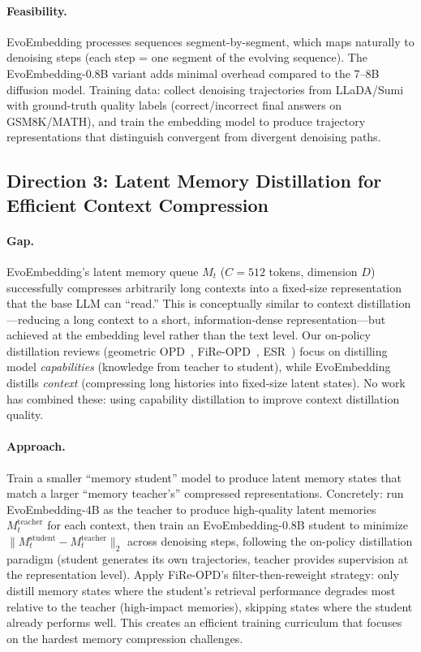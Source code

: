 \documentclass[11pt,a4paper]{article}
\begin{document}
\paragraph{Feasibility.} EvoEmbedding processes sequences segment-by-segment, which maps naturally to denoising steps (each step = one segment of the evolving sequence). The EvoEmbedding-0.8B variant adds minimal overhead compared to the 7--8B diffusion model. Training data: collect denoising trajectories from LLaDA/Sumi with ground-truth quality labels (correct/incorrect final answers on GSM8K/MATH), and train the embedding model to produce trajectory representations that distinguish convergent from divergent denoising paths.

\subsection{Direction 3: Latent Memory Distillation for Efficient Context Compression}

\paragraph{Gap.} EvoEmbedding's latent memory queue $M_t$ ($C=512$ tokens, dimension $D$) successfully compresses arbitrarily long contexts into a fixed-size representation that the base LLM can ``read.'' This is conceptually similar to context distillation---reducing a long context to a short, information-dense representation---but achieved at the embedding level rather than the text level. Our on-policy distillation reviews (geometric OPD~\cite{shen2026geometry}, FiRe-OPD~\cite{li2026fireopd}, ESR~\cite{wang2026esr}) focus on distilling model \emph{capabilities} (knowledge from teacher to student), while EvoEmbedding distills \emph{context} (compressing long histories into fixed-size latent states). No work has combined these: using capability distillation to improve context distillation quality.

\paragraph{Approach.} Train a smaller ``memory student'' model to produce latent memory states that match a larger ``memory teacher's'' compressed representations. Concretely: run EvoEmbedding-4B as the teacher to produce high-quality latent memories $M_t^{\mathrm{teacher}}$ for each context, then train an EvoEmbedding-0.8B student to minimize $\|M_t^{\mathrm{student}} - M_t^{\mathrm{teacher}}\|_2$ across denoising steps, following the on-policy distillation paradigm (student generates its own trajectories, teacher provides supervision at the representation level). Apply FiRe-OPD's filter-then-reweight strategy: only distill memory states where the student's retrieval performance degrades most relative to the teacher (high-impact memories), skipping states where the student already performs well. This creates an efficient training curriculum that focuses on the hardest memory compression challenges.
\end{document}

